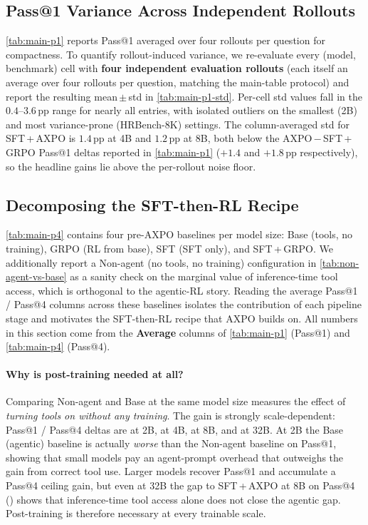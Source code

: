 \subsection{Pass@1 Variance Across Independent Rollouts}
\label{app:pass1-std}


\autoref{tab:main-p1} reports Pass@1 averaged over four rollouts per question for compactness. To quantify rollout-induced variance, we re-evaluate every (model, benchmark) cell with \textbf{four independent evaluation rollouts} (each itself an average over four rollouts per question, matching the main-table protocol) and report the resulting mean\,$\pm$\,std in \autoref{tab:main-p1-std}. Per-cell std values fall in the $0.4$--$3.6$\,pp range for nearly all entries, with isolated outliers on the smallest (2B) and most variance-prone (HRBench-8K) settings. The column-averaged std for SFT\,+\,AXPO is $1.4$\,pp at 4B and $1.2$\,pp at 8B, both below the AXPO\,$-$\,SFT\,+\,GRPO Pass@1 deltas reported in \autoref{tab:main-p1} ($+1.4$ and $+1.8$\,pp respectively), so the headline gains lie above the per-rollout noise floor.

\subsection{Decomposing the SFT-then-RL Recipe}
\label{app:decomp-recipe}

\autoref{tab:main-p4} contains four pre-AXPO baselines per model size: Base (tools, no training), GRPO (RL from base), SFT (SFT only), and SFT\,+\,GRPO. We additionally report a Non-agent (no tools, no training) configuration in \autoref{tab:non-agent-vs-base} as a sanity check on the marginal value of inference-time tool access, which is orthogonal to the agentic-RL story. Reading the average Pass@1 / Pass@4 columns across these baselines isolates the contribution of each pipeline stage and motivates the SFT-then-RL recipe that AXPO builds on. All numbers in this section come from the \textbf{Average} columns of \autoref{tab:main-p1} (Pass@1) and \autoref{tab:main-p4} (Pass@4).


\paragraph{Why is post-training needed at all?}
Comparing Non-agent and Base at the same model size measures the effect of \emph{turning tools on without any training}. The gain is strongly scale-dependent: Pass@1 / Pass@4 deltas are \dAgentTwoB at 2B, \dAgentFourB at 4B, \dAgentEightB at 8B, and \dAgentThirtyTwoB at 32B. At 2B the Base (agentic) baseline is actually \emph{worse} than the Non-agent baseline on Pass@1, showing that small models pay an agent-prompt overhead that outweighs the gain from correct tool use. Larger models recover Pass@1 and accumulate a Pass@4 ceiling gain, but even at 32B the gap to SFT\,+\,AXPO at 8B on Pass@4 (\eightBvsAgentPassFour) shows that inference-time tool access alone does not close the agentic gap. Post-training is therefore necessary at every trainable scale.

